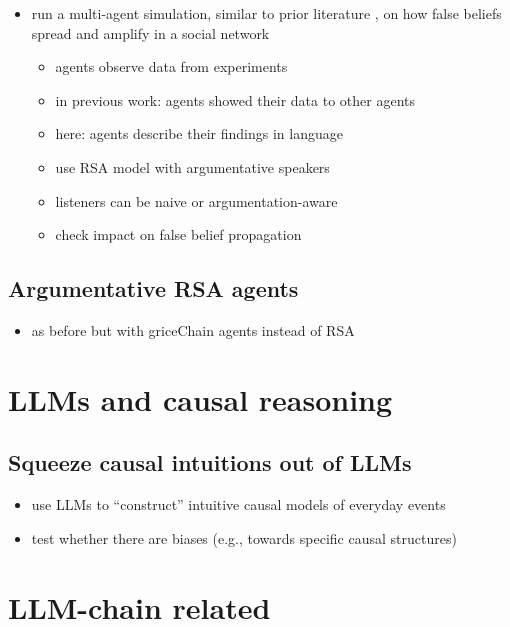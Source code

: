 \documentclass[fleqn,reqno,10pt]{article}
\begin{document}
\begin{itemize}
  \item run a multi-agent simulation, similar to prior literature \citep{Zollman2013:Network-Epistem}, on how false beliefs spread and amplify in a social network
  \begin{itemize}
    \item agents observe data from experiments
    \item in previous work: agents showed their data to other agents
    \item here: agents describe their findings in language
    \item use RSA model with argumentative speakers
    \item listeners can be naive or argumentation-aware
    \item check impact on false belief propagation
  \end{itemize}
\end{itemize}

\subsection{Argumentative RSA agents}

\begin{itemize}
  \item as before but with griceChain agents instead of RSA
\end{itemize}

\section{LLMs and causal reasoning}

\subsection{Squeeze causal intuitions out of LLMs}

\begin{itemize}
  \item use LLMs to ``construct'' intuitive causal models of everyday events
  \item test whether there are biases (e.g., towards specific causal structures)
\end{itemize}

\section{LLM-chain related}
\end{document}
